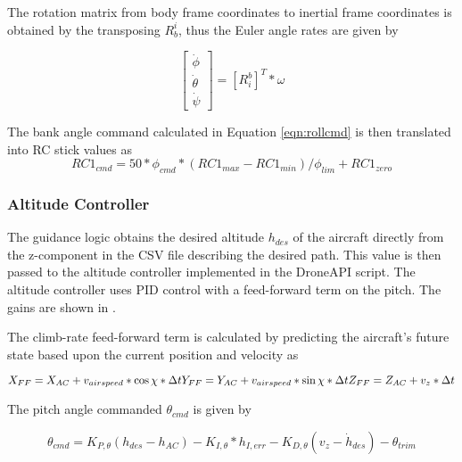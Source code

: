 \documentclass{aiaa}
\begin{document}
The rotation matrix from body frame coordinates to inertial frame coordinates is obtained by the transposing $R_b^i$, thus the Euler angle rates are given by

\begin{equation}
	\begin{bmatrix}
    \dot{\phi}\\
    \dot{\theta}\\
    \dot{\psi}
    \end{bmatrix}
    =[R_i^b]^T*\omega
\end{equation}

The bank angle command calculated in Equation \eqref{eqn:rollcmd} is then translated into RC stick values as
\begin{equation}
RC1_{cmd} = 50*\phi_{cmd}*(RC1_{max} - RC1_{min})/\phi_{lim} + RC1_{zero}
\end{equation}

\subsubsection{Altitude Controller}

The guidance logic obtains the desired altitude $h_{des}$ of the aircraft directly from the z-component in the CSV file describing the desired path. This value is then passed to the altitude controller implemented in the DroneAPI script. The altitude controller uses PID control with a feed-forward term on the pitch. The gains are shown in .

The climb-rate feed-forward term is calculated by predicting the aircraft's future state based upon the current position and velocity as

\begin{equation}
X_{FF} = X_{AC} + v_{airspeed}*\cos{\chi}*\Delta t
\newline
Y_{FF} = Y_{AC} + v_{airspeed}*\sin{\chi}*\Delta t
\newline
Z_{FF} = Z_{AC} + v_z*\Delta t
\end{equation}

The pitch angle commanded $\theta_{cmd}$ is given by

\begin{equation} \theta_{cmd} = K_{P,\theta}(h_{des} - h_{AC}) - K_{I,\theta}*h_{I,err} - K_{D,\theta}(v_z - \dot{h}_{des}) - \theta_{trim}
\end{equation}
\end{document}
